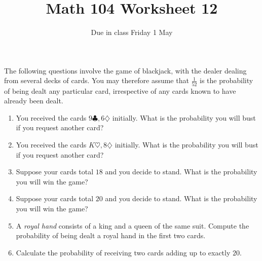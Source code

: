 \documentclass[12pt]{article}
\author{}\date{Due in class Friday 1 May}
\title{Math 104 Worksheet 12}\author{}
\begin{document}
\maketitle
\thispagestyle{empty}
The following questions involve the game of blackjack,
with the dealer dealing from several decks of cards.
You may therefore assume that $\frac{1}{52}$ is the probability
of being dealt any particular card, irrespective of any cards
known to have already been dealt. 
\begin{enumerate}
\item You received the cards $9\clubsuit,6\diamondsuit$
initially. What is the probability you will bust if
you request another card?
\vspace{1cm}
\item You received the cards $K\heartsuit,8\diamondsuit$
initially. What is the probability you will bust if
you request another card?
\vspace{1cm}
\item Suppose your cards total $18$ and you decide to stand.
What is the probability you will win the game?
\vspace{1.5cm}
\item Suppose your cards total $20$ and you decide to stand.
What is the probability you will win the game?
\vspace{1.5cm}
\item A {\em royal hand} consists of a king and a queen
of the same suit. Compute the probability of being
dealt a royal hand in the first two cards.
\vspace{1cm}
\item Calculate the probability of receiving two
cards adding up to exactly $20$.
\end{enumerate}
\end{document}
